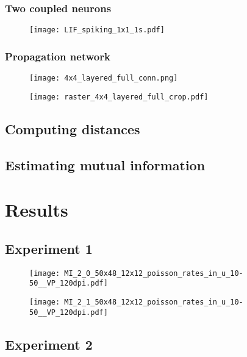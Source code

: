 \documentclass[12pt]{extarticle}
\begin{document}
\subsubsection*{Two coupled neurons}
\begin{figure}[H]
	\centering
	\texttt{[image: LIF\_spiking\_1x1\_1s.pdf]}
    \caption{}
\end{figure}

\subsubsection*{Propagation network}
\begin{figure}[H]
	\centering
	\texttt{[image: 4x4\_layered\_full\_conn.png]}
    \caption{}
\end{figure}


\begin{figure}[H]
	\centering
	\texttt{[image: raster\_4x4\_layered\_full\_crop.pdf]}
    \caption{}
\end{figure}

\subsection{Computing distances}

\subsection{Estimating mutual information}




\newpage
\section{Results}
\subsection{Experiment 1}
\begin{figure}[H]
	\centering
	\texttt{[image: MI\_2\_0\_50x48\_12x12\_poisson\_rates\_in\_u\_10-50\_\_VP\_120dpi.pdf]}
    \caption{}
\end{figure}


\begin{figure}[H]
	\centering
	\texttt{[image: MI\_2\_1\_50x48\_12x12\_poisson\_rates\_in\_u\_10-50\_\_VP\_120dpi.pdf]}
    \caption{}
\end{figure}


\subsection{Experiment 2}
\end{document}
